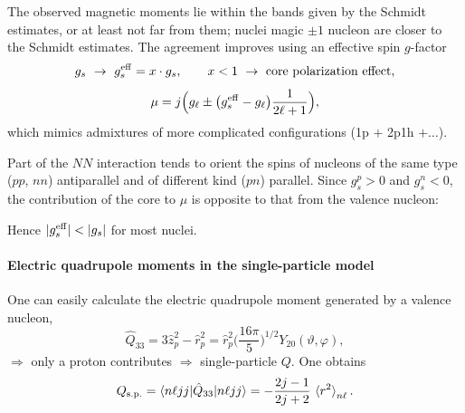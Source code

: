 \documentclass[11pt,a4paper]{article}
\newcommand{\op}[1]{\hat{#1}}
\begin{document}
The observed magnetic moments lie within the bands given by the Schmidt estimates, or at least not far from them; nuclei magic $\pm1$ nucleon are closer to the Schmidt estimates. The agreement improves using an effective spin $g$-factor
\[
g_s\ \to\ g_s^{\rm eff}=x\cdot g_s,\qquad x<1\ \to\ \text{core polarization effect},
\]
\[
\mu=j\Big(g_\ell\pm\big(g_s^{\rm eff}-g_\ell\big)\frac{1}{2\ell+1}\Big),
\]
which mimics admixtures of more complicated configurations (1p $+$ 2p1h $+\dots$).

Part of the $NN$ interaction tends to orient the spins of nucleons of the same type ($pp$, $nn$) antiparallel and of different kind ($pn$) parallel. Since $g_s^p>0$ and $g_s^n<0$, the contribution of the core to $\mu$ is opposite to that from the valence nucleon:
\begin{center}
\end{center}
Hence $|g_s^{\rm eff}|<|g_s|$ for most nuclei.

\paragraph{Electric quadrupole moments in the single-particle model}
One can easily calculate the electric quadrupole moment generated by a valence nucleon,
\[
\op Q_{33}=3\op z_p^2-\op r_p^2=\op r_p^2\Big(\frac{16\pi}{5}\Big)^{1/2}Y_{20}(\vartheta,\varphi),
\]
$\Rightarrow$ only a proton contributes $\Rightarrow$ single-particle $Q$. One obtains
\[
Q_{\rm s.p.}=\braket{n\ell jj|\op Q_{33}|n\ell jj}=-\frac{2j-1}{2j+2}\,\braket{r^2}_{n\ell}.
\]
\end{document}
